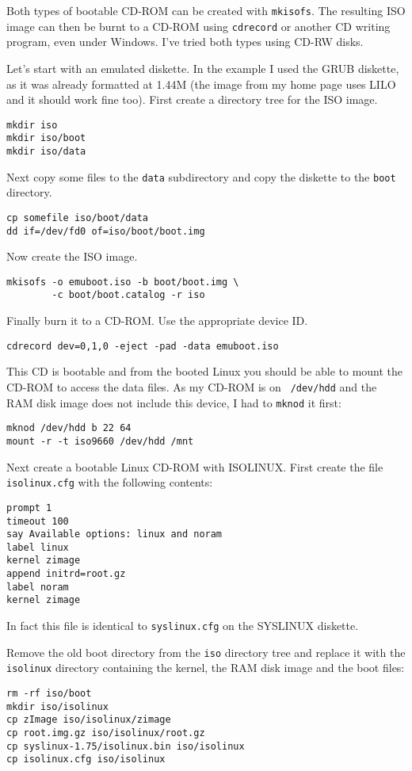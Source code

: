 \documentclass[12pt,a4paper]{article}
\begin{document}
Both types of bootable CD-ROM can be created with {\tt mkisofs}. The
resulting ISO image can then be burnt to a CD-ROM using {\tt cdrecord}
or another CD writing program, even under Windows. I've tried both
types using CD-RW disks.

Let's start with an emulated diskette. In the example I used the GRUB
diskette, as it was already formatted at 1.44M (the image from my home
page uses LILO and it should work fine too). First create a directory
tree for the ISO image.
\begin{verbatim}
mkdir iso
mkdir iso/boot
mkdir iso/data
\end{verbatim}
Next copy some files to the {\tt data} subdirectory and copy the
diskette to the {\tt boot} directory.
\begin{verbatim}
cp somefile iso/boot/data
dd if=/dev/fd0 of=iso/boot/boot.img
\end{verbatim}
Now create the ISO image.
\begin{verbatim}
mkisofs -o emuboot.iso -b boot/boot.img \ 
        -c boot/boot.catalog -r iso
\end{verbatim}
Finally burn it to a CD-ROM. Use the appropriate device ID.
\begin{verbatim}
cdrecord dev=0,1,0 -eject -pad -data emuboot.iso
\end{verbatim}

This CD is bootable and from the booted Linux you should be able to
mount the CD-ROM to access the data files. As my CD-ROM is on {\tt
  /dev/hdd} and the RAM disk image does not include this device, I had to 
{\tt mknod} it first:
\begin{verbatim}
mknod /dev/hdd b 22 64
mount -r -t iso9660 /dev/hdd /mnt
\end{verbatim}

Next create a bootable Linux CD-ROM with ISOLINUX. First create the
file {\tt isolinux.cfg} with the following contents:
\begin{verbatim}
prompt 1
timeout 100
say Available options: linux and noram
label linux
kernel zimage
append initrd=root.gz
label noram
kernel zimage
\end{verbatim}
In fact this file is identical to {\tt syslinux.cfg} on the SYSLINUX diskette.

Remove the old boot directory from the {\tt iso} directory tree and
replace it with the {\tt isolinux} directory containing the kernel,
the RAM disk image and the boot files:
\begin{verbatim}
rm -rf iso/boot
mkdir iso/isolinux
cp zImage iso/isolinux/zimage
cp root.img.gz iso/isolinux/root.gz
cp syslinux-1.75/isolinux.bin iso/isolinux
cp isolinux.cfg iso/isolinux
\end{verbatim}
\end{document}
